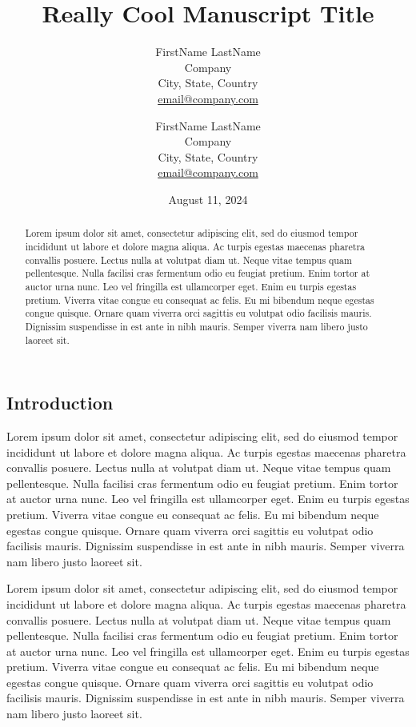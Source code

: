 \documentclass[
  twocolumn]{article}
\title{Really Cool Manuscript Title}
\author{
      {FirstName LastName} \\
        Company \\
    City, State, Country
     \\
    \href{mailto:email@company.com}{email@company.com}
     \and 
      {FirstName LastName} \\
        Company \\
    City, State, Country
     \\
    \href{mailto:email@company.com}{email@company.com}
    }
\date{August 11, 2024}
\begin{document}
\maketitle
\begin{abstract}
Lorem ipsum dolor sit amet, consectetur adipiscing elit, sed do eiusmod
tempor incididunt ut labore et dolore magna aliqua. Ac turpis egestas
maecenas pharetra convallis posuere. Lectus nulla at volutpat diam ut.
Neque vitae tempus quam pellentesque. Nulla facilisi cras fermentum odio
eu feugiat pretium. Enim tortor at auctor urna nunc. Leo vel fringilla
est ullamcorper eget. Enim eu turpis egestas pretium. Viverra vitae
congue eu consequat ac felis. Eu mi bibendum neque egestas congue
quisque. Ornare quam viverra orci sagittis eu volutpat odio facilisis
mauris. Dignissim suspendisse in est ante in nibh mauris. Semper viverra
nam libero justo laoreet sit.
\end{abstract}
\ifdefined\Shaded\renewenvironment{Shaded}{\begin{tcolorbox}[borderline west={3pt}{0pt}{shadecolor}, enhanced, breakable, boxrule=0pt, sharp corners, interior hidden, frame hidden]}{\end{tcolorbox}}\fi

\hypertarget{introduction}{%
\subsection{Introduction}\label{introduction}}

Lorem ipsum dolor sit amet, consectetur adipiscing elit, sed do eiusmod
tempor incididunt ut labore et dolore magna aliqua. Ac turpis egestas
maecenas pharetra convallis posuere. Lectus nulla at volutpat diam ut.
Neque vitae tempus quam pellentesque. Nulla facilisi cras fermentum odio
eu feugiat pretium. Enim tortor at auctor urna nunc. Leo vel fringilla
est ullamcorper eget. Enim eu turpis egestas pretium. Viverra vitae
congue eu consequat ac felis. Eu mi bibendum neque egestas congue
quisque. Ornare quam viverra orci sagittis eu volutpat odio facilisis
mauris. Dignissim suspendisse in est ante in nibh mauris. Semper viverra
nam libero justo laoreet sit.

Lorem ipsum dolor sit amet, consectetur adipiscing elit, sed do eiusmod
tempor incididunt ut labore et dolore magna aliqua. Ac turpis egestas
maecenas pharetra convallis posuere. Lectus nulla at volutpat diam ut.
Neque vitae tempus quam pellentesque. Nulla facilisi cras fermentum odio
eu feugiat pretium. Enim tortor at auctor urna nunc. Leo vel fringilla
est ullamcorper eget. Enim eu turpis egestas pretium. Viverra vitae
congue eu consequat ac felis. Eu mi bibendum neque egestas congue
quisque. Ornare quam viverra orci sagittis eu volutpat odio facilisis
mauris. Dignissim suspendisse in est ante in nibh mauris. Semper viverra
nam libero justo laoreet sit.
\end{document}
